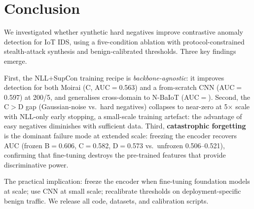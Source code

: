 \section{Conclusion}
\label{sec:conclusion}

We investigated whether synthetic hard negatives improve contrastive
anomaly detection for IoT IDS, using a five-condition ablation with
protocol-constrained stealth-attack synthesis and benign-calibrated thresholds.
Three key findings emerge.

First, the NLL$+$SupCon training recipe is \emph{backbone-agnostic}:
it improves detection for both Moirai (C, AUC$=$0.563) and a from-scratch
CNN (AUC$=$0.597) at 200/5, and generalises cross-domain to N-BaIoT
(AUC$=$\nbaiotAUC{}).
Second, the C$>$D gap (Gaussian-noise vs.\ hard negatives) collapses
to near-zero at 5$\times$ scale with NLL-only early stopping, a
small-scale training artefact: the advantage of easy negatives diminishes
with sufficient data.
Third, \textbf{catastrophic forgetting} is the dominant failure mode at
extended scale: freezing the encoder recovers AUC
(frozen B$=$0.606, C$=$0.582, D$=$0.573 vs.\ unfrozen 0.506--0.521),
confirming that fine-tuning destroys the pre-trained features that
provide discriminative power.

The practical implication: freeze the encoder when fine-tuning foundation
models at scale; use CNN at small scale; recalibrate thresholds on
deployment-specific benign traffic.
We release all code, datasets, and calibration scripts.
